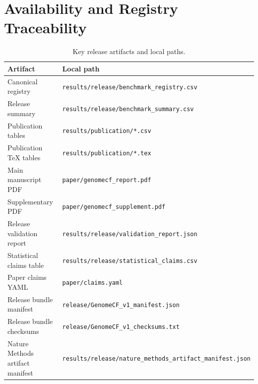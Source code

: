 \documentclass[11pt]{article}
\begin{document}
\section{Availability and Registry Traceability}

\begin{table}[h]
  \centering
  \caption{Key release artifacts and local paths.}
  \small
  \begin{tabular}{p{4.2cm}p{9.2cm}}
    \toprule
    Artifact & Local path \\
    \midrule
    Canonical registry & \texttt{results/release/benchmark\_registry.csv} \\
    Release summary & \texttt{results/release/benchmark\_summary.csv} \\
    Publication tables & \texttt{results/publication/*.csv} \\
    Publication TeX tables & \texttt{results/publication/*.tex} \\
    Main manuscript PDF & \texttt{paper/genomecf\_report.pdf} \\
    Supplementary PDF & \texttt{paper/genomecf\_supplement.pdf} \\
    Release validation report & \texttt{results/release/validation\_report.json} \\
    Statistical claims table & \texttt{results/release/statistical\_claims.csv} \\
    Paper claims YAML & \texttt{paper/claims.yaml} \\
    Release bundle manifest & \texttt{release/GenomeCF\_v1\_manifest.json} \\
    Release bundle checksums & \texttt{release/GenomeCF\_v1\_checksums.txt} \\
    Nature Methods artifact manifest & \texttt{results/release/nature\_methods\_artifact\_manifest.json} \\
    \bottomrule
  \end{tabular}
\end{table}
\end{document}
